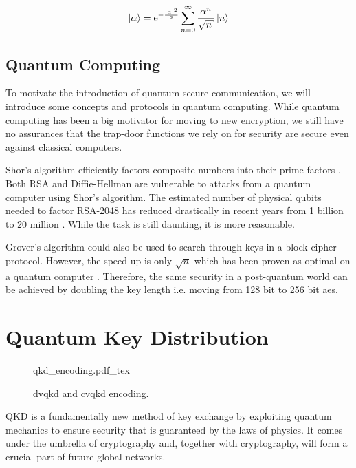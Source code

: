 \begin{equation}
	\ket{\alpha} = \mathrm{e}^{-\frac{|\alpha|^2}{2}} \sum_{n=0}^\infty \frac{\alpha^n}{\sqrt{n}} \ket{n} 
\end{equation}

\subsection{Quantum Computing}

To motivate the introduction of quantum-secure communication, we will introduce some concepts and protocols in quantum computing. While quantum computing has been a big motivator for moving to new encryption, we still have no assurances that the trap-door functions we rely on for security are secure even against classical computers.

Shor's algorithm efficiently factors composite numbers into their prime factors \cite{shor1994}. Both RSA and Diffie-Hellman are vulnerable to attacks from a quantum computer using Shor's algorithm. The estimated number of physical qubits needed to factor RSA-2048 has reduced drastically in recent years from 1 billion \cite{mosca2018, fowler2012} to 20 million \cite{gidney2019}. While the task is still daunting, it is more reasonable.

Grover's algorithm could also be used to search through keys in a block cipher protocol. However, the speed-up is only $\sqrt{n}$ which has been proven as optimal on a quantum computer \cite{Bennent1997} . Therefore, the same security in a post-quantum world can be achieved by doubling the key length i.e. moving from 128 bit to 256 bit \ac{aes}.

\section{Quantum Key Distribution}

\begin{figure}
	\centering
	\def\svgwidth{0.9\textwidth}
   	{qkd_encoding.pdf_tex}
   	\caption[\acs{dvqkd} and \acs{cvqkd} encoding]{\acs{dvqkd} and \acs{cvqkd} encoding.}
\end{figure}

\Acl{QKD} is a fundamentally new method of key exchange by exploiting quantum mechanics to ensure security that is guaranteed by the laws of physics. It comes under the umbrella of  cryptography and, together with  cryptography, will form a crucial part of future global networks.

